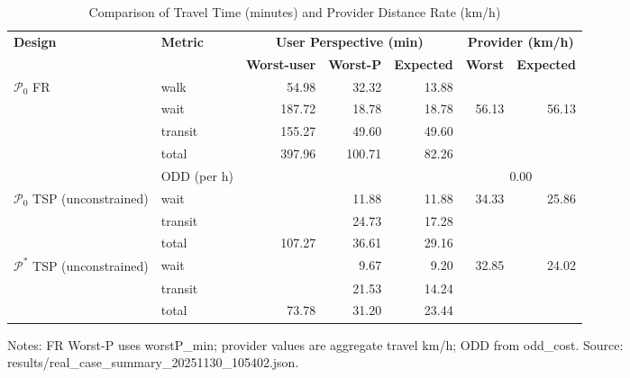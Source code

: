 \begin{table}[t]
\centering
\caption{Comparison of Travel Time (minutes) and Provider Distance Rate (km/h)}
\begin{tabular}{l l r r r r r}
\toprule
\textbf{Design} & \textbf{Metric} & 
\multicolumn{3}{c}{\textbf{User Perspective (min)}} & 
\multicolumn{2}{c}{\textbf{Provider (km/h)}} \\
\cmidrule(lr){3-5}\cmidrule(lr){6-7}
& & \textbf{Worst-user} & \textbf{Worst-P} & \textbf{Expected} & \textbf{Worst} & \textbf{Expected} \\
\midrule
$\mathcal{P}_0$ FR & walk    & 54.98 & 32.32 & 13.88 &        &        \\
                   & wait    & 187.72 & 18.78 & 18.78 & 56.13  & 56.13  \\
                   & transit & 155.27 & 49.60 & 49.60 &        &        \\
                   & total   & 397.96 & 100.71 & 82.26 &       &        \\
                   & ODD (per h) &  &  &  & \multicolumn{2}{c}{0.00} \\
\midrule
$\mathcal{P}_0$ TSP (unconstrained) & wait    &  & 11.88 & 11.88 & 34.33 & 25.86 \\
                                    & transit &  & 24.73 & 17.28 &        &       \\
                                    & total   & 107.27 & 36.61 & 29.16 &        &       \\
\midrule
$\mathcal{P}^*$ TSP (unconstrained) & wait    &  & 9.67 & 9.20 & 32.85 & 24.02 \\
                                    & transit &  & 21.53 & 14.24 &        &       \\
                                    & total   & 73.78 & 31.20 & 23.44 &        &       \\
\bottomrule
\end{tabular}

\vspace{0.5ex}
\small
Notes: FR Worst-P uses worstP\_min; provider values are aggregate travel km/h; ODD from odd\_cost. Source: results/real_case_summary_20251130_105402.json.
\end{table}